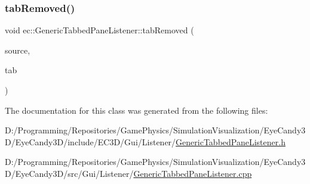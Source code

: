 \subsubsection{\texorpdfstring{tab\+Removed()}{tabRemoved()}}
{\footnotesize\ttfamily void ec\+::\+Generic\+Tabbed\+Pane\+Listener\+::tab\+Removed (\begin{DoxyParamCaption}\item[{agui\+::\+Tabbed\+Pane $\ast$}]{source,  }\item[{agui\+::\+Tab $\ast$}]{tab }\end{DoxyParamCaption})\hspace{0.3cm}{\ttfamily [override]}}



The documentation for this class was generated from the following files\+:\begin{DoxyCompactItemize}
\item 
D\+:/\+Programming/\+Repositories/\+Game\+Physics/\+Simulation\+Visualization/\+Eye\+Candy3\+D/\+Eye\+Candy3\+D/include/\+E\+C3\+D/\+Gui/\+Listener/\mbox{\hyperlink{_generic_tabbed_pane_listener_8h}{Generic\+Tabbed\+Pane\+Listener.\+h}}\item 
D\+:/\+Programming/\+Repositories/\+Game\+Physics/\+Simulation\+Visualization/\+Eye\+Candy3\+D/\+Eye\+Candy3\+D/src/\+Gui/\+Listener/\mbox{\hyperlink{_generic_tabbed_pane_listener_8cpp}{Generic\+Tabbed\+Pane\+Listener.\+cpp}}\end{DoxyCompactItemize}
